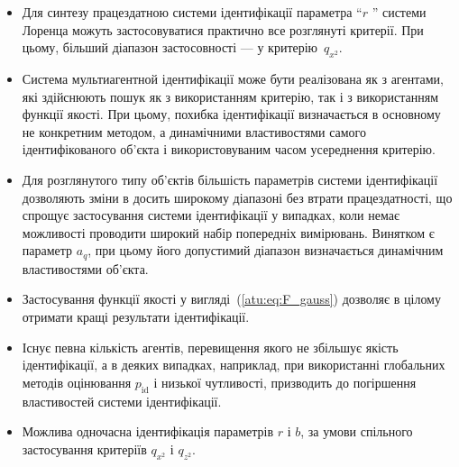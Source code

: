 \begin{itemize}

  \item
    Для синтезу працездатною системи ідентифікації параметра
    ``$r$ '' системи Лоренца можуть застосовуватися практично все
    розглянуті критерії. При цьому, більший діапазон застосовності
    --- у критерію~$ q_{x^2} $.

  \item
    Система мультиагентной ідентифікації може бути реалізована
    як з агентами, які здійснюють пошук як з використанням
    критерію, так і з використанням функції якості. При цьому,
    похибка ідентифікації визначається в основному не конкретним
    методом, а динамічними властивостями самого ідентифікованого
    об'єкта і використовуваним часом усереднення критерію.

  \item
    Для розглянутого типу об'єктів більшість параметрів системи
    ідентифікації дозволяють зміни в досить широкому діапазоні
    без втрати працездатності, що спрощує застосування системи
    ідентифікації у випадках, коли немає можливості проводити
    широкий набір попередніх вимірювань. Винятком є параметр
    $a_q$, при цьому його допустимий діапазон визначається динамічним
    властивостями об'єкта.

  \item
    Застосування функції якості у вигляді~(\ref{atu:eq:F_gauss}) дозволяє в
    цілому отримати кращі результати ідентифікації.

  \item
    Існує певна кількість агентів, перевищення якого не збільшує
    якість ідентифікації, а в деяких випадках, наприклад, при
    використанні глобальних методів оцінювання
    $p_\mathrm{id} $ і низької чутливості, призводить до погіршення
    властивостей системи ідентифікації.

  \item
    Можлива одночасна ідентифікація параметрів
    $ r $ і
    $ b $, за умови спільного застосування критеріїв
    $ q_{x^2} $ і
    $ q_{z^2} $.

\end{itemize}








